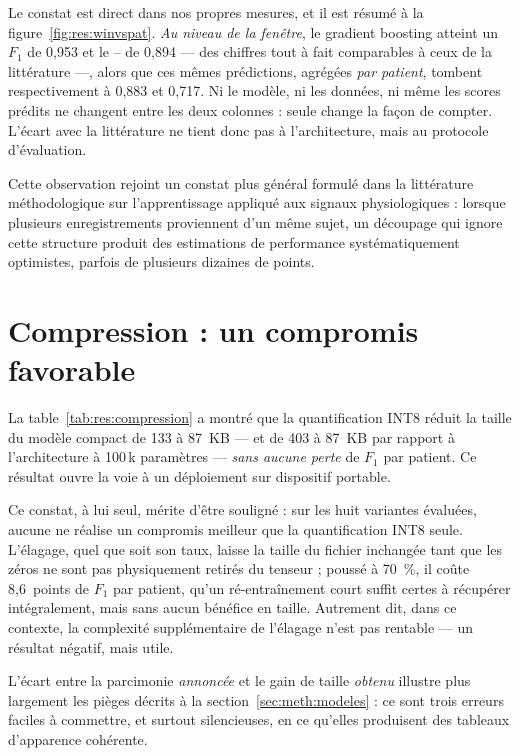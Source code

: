 Le constat est direct dans nos propres mesures, et il est résumé à la figure~\ref{fig:res:winvspat}. \emph{Au niveau de la fenêtre}, le gradient boosting atteint un \(F_1\) de 0,953 et le \CNN--\LSTM{} de 0,894 — des chiffres tout à fait comparables à ceux de la littérature —, alors que ces mêmes prédictions, agrégées \emph{par patient}, tombent respectivement à 0,883 et 0,717. Ni le modèle, ni les données, ni même les scores prédits ne changent entre les deux colonnes : seule change la façon de compter. L'écart avec la littérature ne tient donc pas à l'architecture, mais au protocole d'évaluation.

Cette observation rejoint un constat plus général formulé dans la littérature méthodologique sur l'apprentissage appliqué aux signaux physiologiques \cite{saeb2017need} : lorsque plusieurs enregistrements proviennent d'un même sujet, un découpage qui ignore cette structure produit des estimations de performance systématiquement optimistes, parfois de plusieurs dizaines de points.

\section{Compression : un compromis favorable}
\label{sec:disc:compression}

La table~\ref{tab:res:compression} a montré que la quantification INT8 réduit la taille du modèle compact de 133 à 87~KB — et de 403 à 87~KB par rapport à l'architecture à 100\,k paramètres — \emph{sans aucune perte} de \(F_1\) par patient. Ce résultat ouvre la voie à un déploiement sur dispositif portable.

Ce constat, à lui seul, mérite d'être souligné : sur les huit variantes évaluées, aucune ne réalise un compromis meilleur que la quantification INT8 seule. L'élagage, quel que soit son taux, laisse la taille du fichier inchangée tant que les zéros ne sont pas physiquement retirés du tenseur ; poussé à 70~\%, il coûte 8,6~points de \(F_1\) par patient, qu'un ré-entraînement court suffit certes à récupérer intégralement, mais sans aucun bénéfice en taille. Autrement dit, dans ce contexte, la complexité supplémentaire de l'élagage n'est pas rentable — un résultat négatif, mais utile.

L'écart entre la parcimonie \emph{annoncée} et le gain de taille \emph{obtenu} illustre plus largement les pièges décrits à la section~\ref{sec:meth:modeles} : ce sont trois erreurs faciles à commettre, et surtout silencieuses, en ce qu'elles produisent des tableaux d'apparence cohérente.

